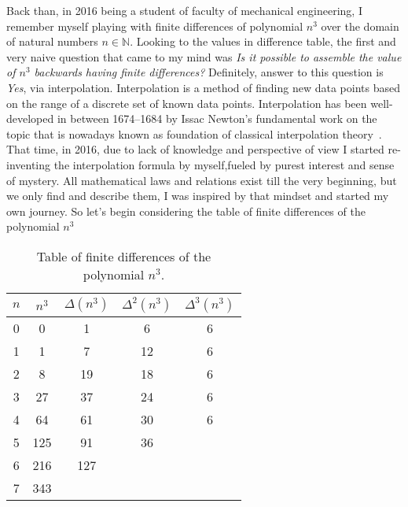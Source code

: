 Back than, in 2016 being a student of faculty of mechanical engineering,
I remember myself playing with finite differences of polynomial $n^3$ over the domain of natural numbers $n\in\mathbb{N}$.
Looking to the values in difference table,
the first and very naive question that came to my mind was \textit{Is it possible to assemble the value of
    $n^3$ backwards having finite differences?}
Definitely, answer to this question is \textit{Yes}, via interpolation.
Interpolation is a method of finding new data points based on the range of a discrete set of known data points.
Interpolation has been well-developed in between 1674--1684
by Issac Newton's fundamental work on the topic that is nowadays known as foundation of classical interpolation
theory~\cite{meijering2002chronology}.
That time, in 2016, due to lack of knowledge and perspective of view I started re-inventing the interpolation
formula by myself,fueled by purest interest and sense of mystery.
All mathematical laws and relations exist till the very beginning, but we only find and describe them,
I was inspired by that mindset and started my own journey.
So let's begin considering the table of finite differences of the polynomial $n^3$
\begin{table}[H]
    \begin{center}
        \setlength\extrarowheight{-6pt}
        \begin{tabular}{c|cccc}
            $n$ & $n^3$ & $\Delta(n^3)$ & $\Delta^2(n^3)$ & $\Delta^3(n^3)$ \\
            \hline
            0   & 0     & 1             & 6               & 6               \\
            1   & 1     & 7             & 12              & 6               \\
            2   & 8     & 19            & 18              & 6               \\
            3   & 27    & 37            & 24              & 6               \\
            4   & 64    & 61            & 30              & 6               \\
            5   & 125   & 91            & 36              &                 \\
            6   & 216   & 127           &                 &                 \\
            7   & 343   &               &                 &
        \end{tabular}
    \end{center}
    \caption{Table of finite differences of the polynomial $n^3$.} \label{tab:table}
\end{table}
